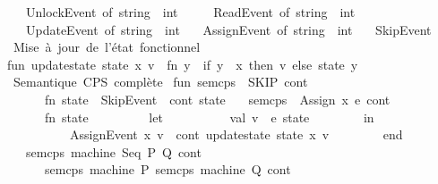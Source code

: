 \begin{isabellebody}
\ \ {\isacharbar}{\kern0pt}\ UnlockEvent\ of\ string\ {\isacharasterisk}{\kern0pt}\ int\ \ \isanewline
\ \ {\isacharbar}{\kern0pt}\ ReadEvent\ of\ string\ {\isacharasterisk}{\kern0pt}\ int\isanewline
\ \ {\isacharbar}{\kern0pt}\ UpdateEvent\ of\ string\ {\isacharasterisk}{\kern0pt}\ int\isanewline
\ \ {\isacharbar}{\kern0pt}\ AssignEvent\ of\ string\ {\isacharasterisk}{\kern0pt}\ int\isanewline
\ \ {\isacharbar}{\kern0pt}\ SkipEvent\isanewline
{\isacharparenleft}{\kern0pt}{\isacharasterisk}{\kern0pt}\ Mise\ à\ jour\ de\ l’état\ fonctionnel\ {\isacharasterisk}{\kern0pt}{\isacharparenright}{\kern0pt}\isanewline
fun\ update{\isacharunderscore}{\kern0pt}state\ state\ x\ v\ {\isacharequal}{\kern0pt}\ fn\ y\ {\isacharequal}{\kern0pt}{\isachargreater}{\kern0pt}\ if\ y\ {\isacharequal}{\kern0pt}\ x\ then\ v\ else\ state\ y\isanewline
\isanewline
{\isacharparenleft}{\kern0pt}{\isacharasterisk}{\kern0pt}\ Semantique\ CPS\ complète\ {\isacharasterisk}{\kern0pt}{\isacharparenright}{\kern0pt}\isanewline
fun\ sem{\isacharunderscore}{\kern0pt}cps\ {\isacharunderscore}{\kern0pt}\ SKIP\ cont\ {\isacharequal}{\kern0pt}\isanewline
\ \ \ \ \ \ {\isacharparenleft}{\kern0pt}fn\ state\ {\isacharequal}{\kern0pt}{\isachargreater}{\kern0pt}\ SkipEvent\ {\isacharcolon}{\kern0pt}{\isacharcolon}{\kern0pt}\ cont\ state{\isacharparenright}{\kern0pt}\isanewline
\isanewline
\ \ {\isacharbar}{\kern0pt}\ sem{\isacharunderscore}{\kern0pt}cps\ {\isacharunderscore}{\kern0pt}\ {\isacharparenleft}{\kern0pt}Assign\ {\isacharparenleft}{\kern0pt}x{\isacharcomma}{\kern0pt}\ e{\isacharparenright}{\kern0pt}{\isacharparenright}{\kern0pt}\ cont\ {\isacharequal}{\kern0pt}\ \isanewline
\ \ \ \ \ \ {\isacharparenleft}{\kern0pt}fn\ state\ {\isacharequal}{\kern0pt}{\isachargreater}{\kern0pt}\isanewline
\ \ \ \ \ \ \ \ let\isanewline
\ \ \ \ \ \ \ \ \ \ val\ v\ {\isacharequal}{\kern0pt}\ e\ state\isanewline
\ \ \ \ \ \ \ \ in\isanewline
\ \ \ \ \ \ \ \ \ \ AssignEvent\ {\isacharparenleft}{\kern0pt}x{\isacharcomma}{\kern0pt}\ v{\isacharparenright}{\kern0pt}\ {\isacharcolon}{\kern0pt}{\isacharcolon}{\kern0pt}\ cont\ {\isacharparenleft}{\kern0pt}update{\isacharunderscore}{\kern0pt}state\ state\ x\ v{\isacharparenright}{\kern0pt}\isanewline
\ \ \ \ \ \ \ \ end{\isacharparenright}{\kern0pt}\isanewline
\isanewline
\ \ {\isacharbar}{\kern0pt}\ sem{\isacharunderscore}{\kern0pt}cps\ machine\ {\isacharparenleft}{\kern0pt}Seq\ {\isacharparenleft}{\kern0pt}P{\isacharcomma}{\kern0pt}\ Q{\isacharparenright}{\kern0pt}{\isacharparenright}{\kern0pt}\ cont\ {\isacharequal}{\kern0pt}\ \isanewline
\ \ \ \ \ \ sem{\isacharunderscore}{\kern0pt}cps\ machine\ P\ {\isacharparenleft}{\kern0pt}sem{\isacharunderscore}{\kern0pt}cps\ machine\ Q\ cont{\isacharparenright}{\kern0pt}\isanewline

\end{isabellebody}
